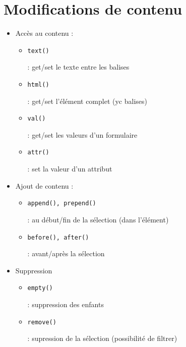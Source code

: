 \hypertarget{modifications-de-contenu}{%
\section{Modifications de contenu}\label{modifications-de-contenu}}

\begin{itemize}
\tightlist
\item
  Accès au contenu :

  \begin{itemize}
  \tightlist
  \item
    \begin{otherlanguage}{english}\texttt{text()}\end{otherlanguage} :
    get/set le texte entre les balises
  \item
    \begin{otherlanguage}{english}\texttt{html()}\end{otherlanguage} :
    get/set l'élément complet (yc balises)
  \item
    \begin{otherlanguage}{english}\texttt{val()}\end{otherlanguage} :
    get/set les valeurs d'un formulaire
  \item
    \begin{otherlanguage}{english}\texttt{attr()}\end{otherlanguage} :
    set la valeur d'un attribut
  \end{itemize}
\item
  Ajout de contenu :

  \begin{itemize}
  \tightlist
  \item
    \begin{otherlanguage}{english}\texttt{append(),\ prepend()}\end{otherlanguage}
    : au début/fin de la sélection (dans l'élément)
  \item
    \begin{otherlanguage}{english}\texttt{before(),\ after()}\end{otherlanguage}
    : avant/après la sélection
  \end{itemize}
\item
  Suppression

  \begin{itemize}
  \tightlist
  \item
    \begin{otherlanguage}{english}\texttt{empty()}\end{otherlanguage} :
    suppression des enfants
  \item
    \begin{otherlanguage}{english}\texttt{remove()}\end{otherlanguage} :
    supression de la sélection (possibilité de filtrer)
  \end{itemize}
\end{itemize}

